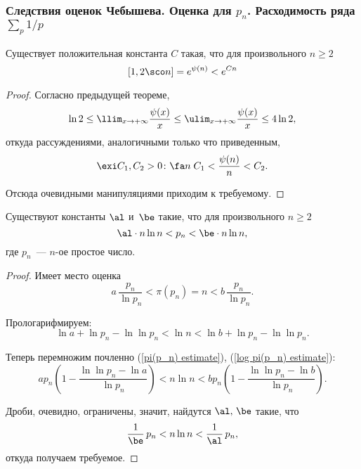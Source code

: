 \subsubsection{Следствия оценок Чебышева. Оценка для $p_n$. Расходимость ряда $\displaystyle \sum_p 1/p$}

\begin{imp}
  Существует положительная константа $C$ такая, что для произвольного $n\ge2$
  $$
    [1,2\sco n]=e^{\psi(n)}<e^{Cn}
  $$
\end{imp}
\begin{proof}
  Согласно предыдущей теореме,
  $$
    \ln{2}\le\llim_{x\rightarrow+\infty}\frac{\psi(x)}{x}\le\ulim_{x\rightarrow+\infty}\frac{\psi(x)}{x}\le4\ln{2},
  $$
  откуда рассуждениями, аналогичными только что приведенным,
  $$
    \exi C_1,C_2>0\colon \fa n\;C_1<\frac{\psi(n)}{n}<C_2.
  $$

  Отсюда очевидными манипуляциями приходим к требуемому.
\end{proof}

\begin{imp}
  Существуют константы $\al$ и~$\be$ такие, что для произвольного $n\ge2$
  $$
    \al\cdot n\ln{n}<p_n<\be\cdot n\ln{n},
  $$
  где $p_n$~— $n$-ое простое число.
\end{imp}
\begin{proof} Имеет место оценка
  \begin{equation}
    \label{pi(p_n) estimate}
    a\,\frac{p_n}{\ln{p_n}}<\pi(p_n)=n<b\,\frac{p_n}{\ln{p_n}}.
  \end{equation}

  Прологарифмируем:
  \begin{equation}
    \label{log pi(p_n) estimate}
    \ln{a}+\ln{p_n}-\ln{\ln{p_n}}<\ln{n}<\ln{b}+\ln{p_n}-\ln{\ln{p_n}}.
  \end{equation}

  Теперь перемножим почленно (\ref{pi(p_n) estimate}), (\ref{log pi(p_n) estimate}):
  $$
    ap_n\left(1-\frac{\ln{\ln{p_n}}-\ln{a}}{\ln{p_n}}\right)<n\ln{n}<bp_n\left(1-\frac{\ln{\ln{p_n}}-\ln{b}}{\ln{p_n}}\right).
  $$

  Дроби, очевидно, ограничены, значит, найдутся $\al,\,\be$ такие, что
  $$
    \frac{1}{\be}\,p_n<n\ln{n}<\frac{1}{\al}\,p_n,
  $$
  откуда получаем требуемое.
\end{proof}

